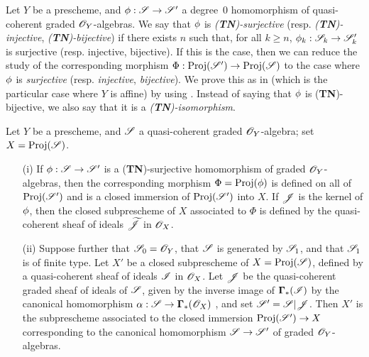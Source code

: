 \begin{env}[3.6.1]
\label{II.3.6.1}
Let $Y$ be a prescheme, and $\vphi:\sh{S}\to\sh{S}'$ a degree~$0$ homomorphism of quasi-coherent graded $\mathscr{O}_Y$-algebras.
We say that $\phi$ is \emph{(\textbf{TN})-surjective} (resp. \emph{(\textbf{TN})-injective}, \emph{(\textbf{TN})-bijective}) if there exists $n$ such that, for all $k\geq n$, $\vphi_k:\sh{S}_k\to\sh{S}'_k$ is surjective (resp. injective, bijective).
If this is the case, then we can reduce the study of the corresponding morphism $\Phi:\Proj(\sh{S}')\to\Proj(\sh{S})$ to the case where $\phi$ is \emph{surjective} (resp. \emph{injective}, \emph{bijective}).
We prove this as in  (which is the particular case where $Y$ is affine) by using .
Instead of saying that $\phi$ is (\textbf{TN})-bijective, we also say that it is a \emph{(\textbf{TN})-isomorphism}.
\end{env}

\begin{proposition}[3.6.2]
\label{II.3.6.2}
Let $Y$ be a prescheme, and $\mathscr{S}$ a quasi-coherent graded $\mathscr{O}_Y$-algebra;
set $X=\operatorname{Proj}(\mathscr{S})$.
\begin{enumerate}
  \item[(i)] If $\vphi:\sh{S}\to\sh{S}'$ is a (\textbf{TN})-surjective homomorphism of graded $\mathscr{O}_Y$-algebras, then the corresponding morphism $\Phi=\operatorname{Proj}(\phi)$  is defined on all of $\operatorname{Proj}(\mathscr{S}')$ and is a closed immersion of $\operatorname{Proj}(\mathscr{S}')$ into $X$.
    If $\mathscr{J}$ is the kernel of $\phi$, then the closed subprescheme of $X$ associated to $\Phi$ is defined by the quasi-coherent sheaf of ideals $\widetilde{\mathscr{J}}$ in $\mathscr{O}_X$.
  \item[(ii)] Suppose further that $\mathscr{S}_0=\mathscr{O}_Y$, that $\mathscr{S}$ is generated by $\mathscr{S}_1$, and that $\mathscr{S}_1$ is of finite type.
    Let $X'$ be a closed subprescheme of $X=\operatorname{Proj}(\mathscr{S})$, defined by a quasi-coherent sheaf of ideals $\mathscr{I}$ in $\mathscr{O}_X$.
    Let $\mathscr{J}$ be the quasi-coherent graded sheaf of ideals of $\mathscr{S}$, given by the inverse image of $\boldsymbol\Gamma_*(\mathscr{I})$ by the canonical homomorphism $\alpha:\sh{S}\to\bbGamma_*(\sh{O}_X)$ , and set $\mathscr{S}'=\mathscr{S}|\mathscr{J}$.
    Then $X'$ is the subprescheme associated  to the closed immersion $\Proj(\sh{S}')\to X$ corresponding to the canonical homomorphism $\sh{S}\to\sh{S}'$ of graded $\mathscr{O}_Y$-algebras.
\end{enumerate}
\end{proposition}

